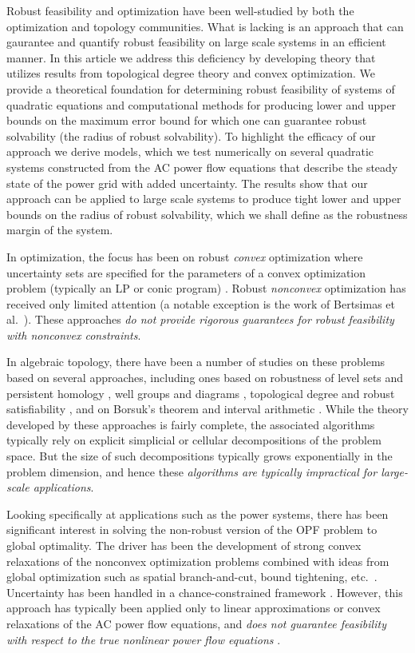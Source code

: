 Robust feasibility and optimization have been well-studied by both the optimization and topology communities. 
What is lacking is an approach that can gaurantee and quantify robust feasibility on large scale systems in an efficient manner. 
In this article we address this deficiency by developing theory that utilizes results from topological degree theory and convex optimization. 
We provide a theoretical foundation for determining robust feasibility of systems of quadratic equations and computational methods for producing lower and upper bounds on the maximum error bound for which one can guarantee robust solvability (the radius of robust solvability). 
To highlight the efficacy of our approach we derive models, which we test numerically on several quadratic systems constructed from the AC power flow equations that describe the steady state of the power grid with added uncertainty. 
The results show that our approach can be applied to large scale systems to produce tight lower and upper bounds on the radius of robust solvability, which we shall define as the robustness margin of the system.

In optimization, the focus has been on robust \emph{convex} optimization where uncertainty sets are specified for the parameters of a convex optimization problem (typically an LP or conic program) \cite{ben2009robust}.
Robust \emph{nonconvex} optimization has received only limited attention (a notable exception is the work of Bertsimas et al.~\cite{BeNoTe2010}).
These approaches {\em do not provide rigorous guarantees for robust feasibility with nonconvex constraints}.

In algebraic topology, there have been a number of studies on these problems based on several approaches, including ones based on robustness of level sets and persistent homology \cite{BeEdMoPa2010,EdMoPa2011}, well groups and diagrams \cite{ChSkPa2012,FrKr2016well,FrKr2016pers}, topological degree and robust satisfiability \cite{FrKr2015,FrKrWa2016},  and on Borsuk's theorem and interval arithmetic \cite{FrRa2015,FrHoLa2007,FrLa2005}.
While the theory developed by these approaches is fairly complete, the associated algorithms typically rely on explicit simplicial or cellular decompositions of the problem space.
But the size of such decompositions typically grows exponentially in the problem dimension, and hence these \emph{algorithms are typically impractical for large-scale applications}.

Looking specifically at applications such as the power systems, there has been significant interest in solving the non-robust version of the OPF problem to global optimality.
The driver has been the development of strong convex relaxations of the nonconvex optimization problems combined with ideas from global optimization such as spatial branch-and-cut, bound tightening, etc.~\cite{BiMu2016,coffrin2015strengthening}.
Uncertainty has been handled in a chance-constrained framework \cite{BiChHa2014,zhang2011chance}.
However, this approach has typically been applied only to linear approximations or convex relaxations of the AC power flow equations, and \emph{does not guarantee feasibility with respect to the true nonlinear power flow equations} \cite{BiChHa2014,kocuk2016strong,RoVrOlAn2015,TsBiTa2016}.
